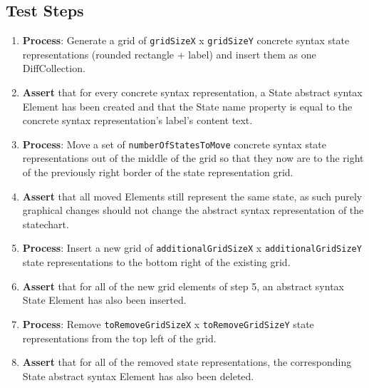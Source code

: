 \subsection{Test Steps}
\begin{enumerate}
  \item \textbf{Process}: Generate a grid of \texttt{gridSizeX} x \texttt{gridSizeY} concrete syntax state representations (rounded rectangle + label) and insert them as one DiffCollection.
  \item \textbf{Assert} that for every concrete syntax representation, a State abstract syntax Element has been created and that the State name property is equal to the concrete
        syntax representation’s label’s content text.
  \item \textbf{Process}: Move a set of \texttt{numberOfStatesToMove} concrete syntax state representations out of the middle of the grid so that they now are to the right of the previously right border of the state representation grid.
  \item \textbf{Assert} that all moved Elements still represent the same state, as such purely graphical changes should not change the abstract syntax representation of the statechart.
  \item \textbf{Process}: Insert a new grid of \texttt{additionalGridSizeX} x \texttt{additionalGridSizeY} state representations to the bottom right of the existing grid.
  \item \textbf{Assert} that for all of the new grid elements of step 5, an abstract syntax State Element has also been inserted.
  \item \textbf{Process}:  Remove \texttt{toRemoveGridSizeX} x \texttt{toRemoveGridSizeY} state representations from the top left of the grid.
  \item \textbf{Assert} that for all of the removed state representations, the corresponding State abstract syntax Element has also been deleted.
\end{enumerate}